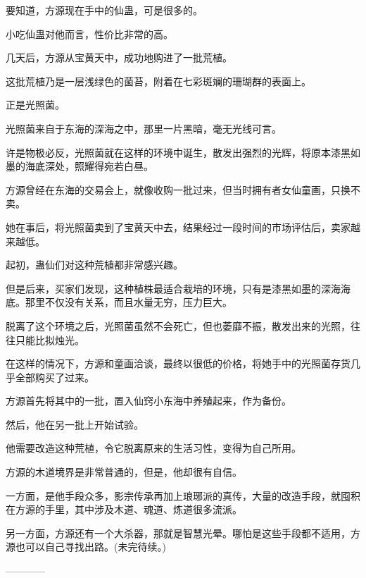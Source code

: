 \begin{this_body}
要知道，方源现在手中的仙蛊，可是很多的。

小吃仙蛊对他而言，性价比非常的高。

几天后，方源从宝黄天中，成功地购进了一批荒植。

这批荒植乃是一层浅绿色的菌苔，附着在七彩斑斓的珊瑚群的表面上。

正是光照菌。

光照菌来自于东海的深海之中，那里一片黑暗，毫无光线可言。

许是物极必反，光照菌就在这样的环境中诞生，散发出强烈的光辉，将原本漆黑如墨的海底深处，照耀得宛若白昼。

方源曾经在东海的交易会上，就像收购一批过来，但当时拥有者女仙童画，只换不卖。

她在事后，将光照菌卖到了宝黄天中去，结果经过一段时间的市场评估后，卖家越来越低。

起初，蛊仙们对这种荒植都非常感兴趣。

但是后来，买家们发现，这种植株最适合栽培的环境，只有是漆黑如墨的深海海底。那里不仅没有关系，而且水量无穷，压力巨大。

脱离了这个环境之后，光照菌虽然不会死亡，但也萎靡不振，散发出来的光照，往往只能比拟烛光。

在这样的情况下，方源和童画洽谈，最终以很低的价格，将她手中的光照菌存货几乎全部购买了过来。

方源首先将其中的一批，置入仙窍小东海中养殖起来，作为备份。

然后，他在另一批上开始试验。

他需要改造这种荒植，令它脱离原来的生活习性，变得为自己所用。

方源的木道境界是非常普通的，但是，他却很有自信。

一方面，是他手段众多，影宗传承再加上琅琊派的真传，大量的改造手段，就囤积在方源的手里，其中涉及木道、魂道、炼道很多流派。

另一方面，方源还有一个大杀器，那就是智慧光晕。哪怕是这些手段都不适用，方源也可以自己寻找出路。(未完待续。)

------------

\end{this_body}

